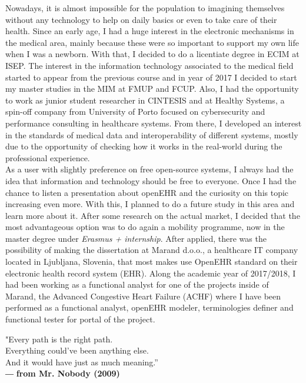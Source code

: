\documentclass[mim_thesis.tex]{subfiles}
\begin{document}
Nowadays, it is almost impossible for the population to imagining themselves without any technology to help on daily basics or even to take care of their health. Since an early age, I had a huge interest in the electronic mechanisms in the medical area, mainly because these were so important to support my own life when I was a newborn. With that, I decided to do a licentiate degree in \ac{ECIM} at \ac{ISEP}. The interest in the information technology associated to the medical field started to appear from the previous course and in year of 2017 I decided to start my master studies in the \ac{MIM} at \ac{FMUP} and \ac{FCUP}. Also, I had the opportunity to work as junior student researcher in \ac{CINTESIS} and at Healthy Systems, a spin-off company from University of Porto focused on cybersecurity and performance consulting in healthcare systems. From there, I developed an interest in the standards of medical data and interoperability of different systems, mostly due to the opportunity of checking how it works in the real-world during the professional experience.\\ 

As a user with slightly preference on free open-source systems, I always had the idea that information and technology should be free to everyone. Once I had the chance to listen a presentation about openEHR and the curiosity on this topic increasing even more. With this, I planned to do a future study in this area and learn more about it. After some research on the actual market, I decided that the most advantageous option was to do again a mobility programme, now in the master degree under \textit{Erasmus + internship}. After applied, there was the possibility of making the dissertation at Marand d.o.o., a healthcare IT company located in Ljubljana, Slovenia, that most makes use OpenEHR standard on their electronic health record system (EHR). Along the academic year of 2017/2018, I had been working as a functional analyst for one of the projects inside of Marand, the Advanced Congestive Heart Failure (ACHF) where I have been performed as a functional analyst, openEHR modeler, terminologies definer and functional tester for portal of the project. \par

\begin{flushright}
\vfill {"Every path is the right path. \\ Everything could've been anything else.\\ And it would have just as much meaning.”}
\\― \textbf{from Mr. Nobody (2009)}
\end{flushright}
\end{document}
